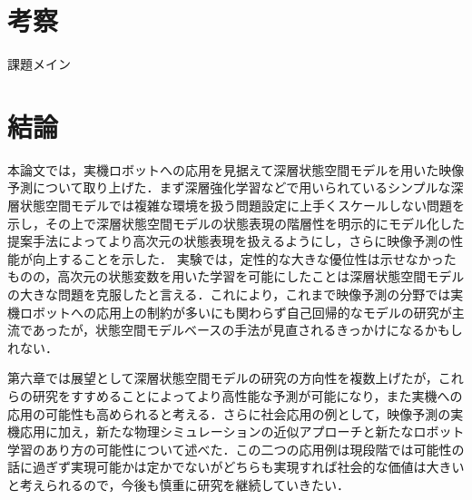 \documentclass[10pt, twocolumn]{jarticle}
\begin{document}
\section{考察}
課題メイン

\section{結論}

本論文では，実機ロボットへの応用を見据えて深層状態空間モデルを用いた映像予測について取り上げた．まず深層強化学習などで用いられているシンプルな深層状態空間モデルでは複雑な環境を扱う問題設定に上手くスケールしない問題を示し，その上で深層状態空間モデルの状態表現の階層性を明示的にモデル化した提案手法によってより高次元の状態表現を扱えるようにし，さらに映像予測の性能が向上することを示した．
実験では，定性的な大きな優位性は示せなかったものの，高次元の状態変数を用いた学習を可能にしたことは深層状態空間モデルの大きな問題を克服したと言える．これにより，これまで映像予測の分野では実機ロボットへの応用上の制約が多いにも関わらず自己回帰的なモデルの研究が主流であったが，状態空間モデルベースの手法が見直されるきっかけになるかもしれない．

第六章では展望として深層状態空間モデルの研究の方向性を複数上げたが，これらの研究をすすめることによってより高性能な予測が可能になり，また実機への応用の可能性も高められると考える．さらに社会応用の例として，映像予測の実機応用に加え，新たな物理シミュレーションの近似アプローチと新たなロボット学習のあり方の可能性について述べた．この二つの応用例は現段階では可能性の話に過ぎず実現可能かは定かでないがどちらも実現すれば社会的な価値は大きいと考えられるので，今後も慎重に研究を継続していきたい．



\end{document}
